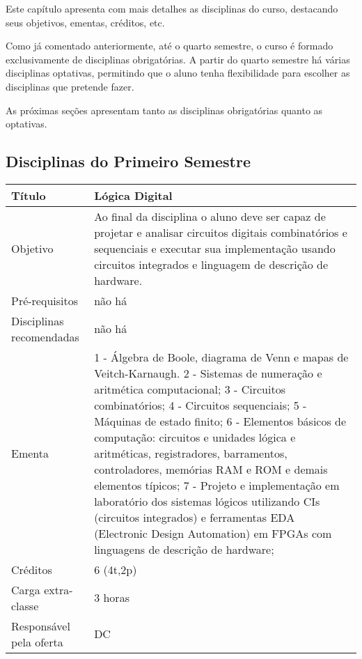 

Este capítulo apresenta com mais detalhes as disciplinas do curso, destacando seus objetivos, ementas, créditos, etc.

Como já comentado anteriormente, até o quarto semestre, o curso é formado exclusivamente de disciplinas obrigatórias. A partir do quarto semestre há várias disciplinas optativas, permitindo que o aluno tenha flexibilidade para escolher as disciplinas que pretende fazer. 

As próximas seções apresentam tanto as disciplinas obrigatórias quanto as optativas.


\subsection{Disciplinas do Primeiro Semestre}



\begin{tabular}{|p{4.5cm}|p{10.0cm}|} \hline
Título & Lógica Digital \\ \hline
Objetivo & Ao final da disciplina o aluno deve ser capaz de projetar e analisar circuitos digitais combinatórios e sequenciais e executar sua implementação usando circuitos integrados e linguagem de descrição de hardware. \\ \hline
Pré-requisitos & não há \\ \hline
Disciplinas recomendadas & não há \\ \hline

Ementa & 1 - Álgebra de Boole, diagrama de Venn e mapas de Veitch-Karnaugh.
2 - Sistemas de numeração e aritmética computacional; 
3 - Circuitos combinatórios; 
4 - Circuitos sequenciais; 
5 - Máquinas de estado finito; 
6 - Elementos básicos de computação: circuitos e unidades lógica e aritméticas, registradores, barramentos, controladores, memórias RAM e ROM e demais elementos típicos; 
7 - Projeto e implementação em laboratório dos sistemas lógicos utilizando CIs (circuitos integrados) e ferramentas EDA (Electronic Design Automation) em FPGAs com linguagens de descrição de hardware;

\\ \hline
Créditos & 6 (4t,2p) \\ \hline
Carga extra-classe & 3 horas \\ \hline
Responsável pela oferta & DC \\ \hline
\end{tabular}
\\
\\


